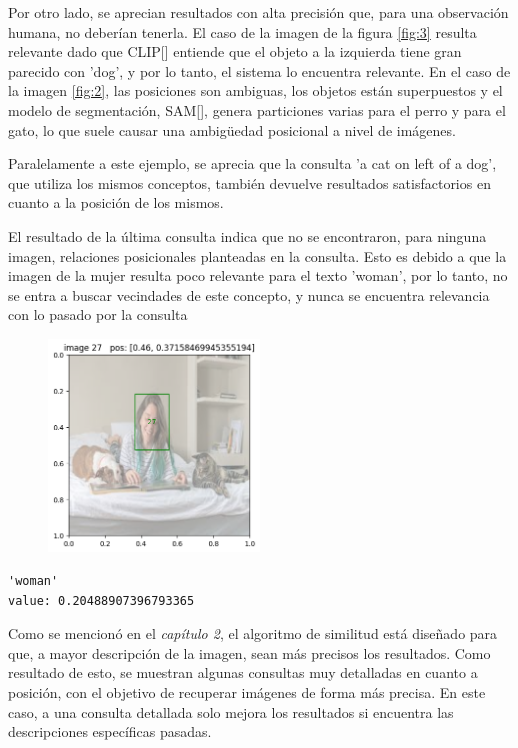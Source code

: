 Por otro lado, se aprecian resultados con alta precisión que, para una observación humana, no deberían tenerla. El caso de la imagen de la figura \ref{fig:3} resulta relevante dado que CLIP[\cite{clip}] entiende que el objeto a la izquierda tiene gran parecido con 'dog', y por lo tanto, el sistema lo encuentra relevante. En el caso de la imagen \ref{fig:2}, las posiciones son ambiguas, los objetos est\'an superpuestos y el modelo de segmentación, SAM[\cite{sam-paper}], genera particiones varias para el perro y para el gato, lo que suele causar una ambigüedad posicional a nivel de im\'agenes.

Paralelamente a este ejemplo, se aprecia que la consulta 'a cat on left of a dog', que utiliza los mismos conceptos, también devuelve resultados satisfactorios en cuanto a la posición de los mismos.

El resultado de la última consulta indica que no se encontraron, para ninguna imagen, relaciones posicionales planteadas en la consulta. Esto es debido a que la imagen de la mujer resulta poco relevante para el texto 'woman', por lo tanto, no se entra a buscar vecindades de este concepto, y nunca se encuentra relevancia con lo pasado por la consulta


\begin{figure}[H]
\centering
 \includegraphics[width=0.5\textwidth]{Graphics/woman.png}
 \caption{ }
 \label{fig:woman}
\end{figure}

\begin{verbatim}
'woman'
value: 0.20488907396793365
\end{verbatim}

Como se mencionó en el \textit{capítulo 2}, el algoritmo de similitud est\'a diseñado para que, a mayor descripción de la imagen, sean m\'as precisos los resultados. Como resultado de esto, se muestran algunas consultas muy detalladas en cuanto a posición, con el objetivo de recuperar im\'agenes de forma m\'as precisa. En este caso, a una consulta detallada solo mejora los resultados si encuentra las descripciones específicas pasadas.

